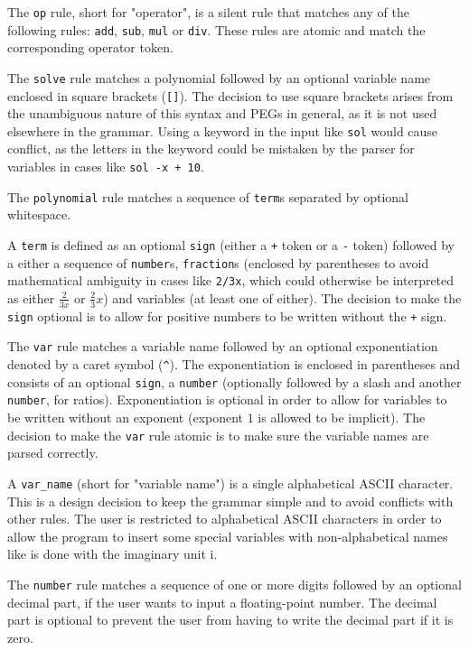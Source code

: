 The \verb|op| rule, short for "operator", is a silent rule that matches any of the following rules: \verb|add|, \verb|sub|, \verb|mul| or \verb|div|. These rules are atomic and match the corresponding operator token.

The \verb|solve| rule matches a polynomial followed by an optional variable name enclosed in square brackets (\verb|[]|). The decision to use square brackets arises from the unambiguous nature of this syntax and PEGs in general, as it is not used elsewhere in the grammar. Using a keyword in the input like \verb|sol| would cause conflict, as the letters in the keyword could be mistaken by the parser for variables in cases like \verb|sol -x + 10|.

The \verb|polynomial| rule matches a sequence of \verb|term|s separated by optional whitespace.

A \verb|term| is defined as an optional \verb|sign| (either a \verb|+| token or a \verb|-| token) followed by a either a sequence of \verb|number|s, \verb|fraction|s (enclosed by parentheses to avoid mathematical ambiguity in cases like \verb|2/3x|, which could otherwise be interpreted as either $\frac{2}{3x}$ or $\frac{2}{3}x$) and variables (at least one of either). The decision to make the \verb|sign| optional is to allow for positive numbers to be written without the \verb|+| sign.

The \verb|var| rule matches a variable name followed by an optional exponentiation denoted by a caret symbol (\verb|^|). The exponentiation is enclosed in parentheses and consists of an optional \verb|sign|, a \verb|number| (optionally followed by a slash and another \verb|number|, for ratios). Exponentiation is optional in order to allow for variables to be written without an exponent (exponent $1$ is allowed to be implicit). The decision to make the \verb|var| rule atomic is to make sure the variable names are parsed correctly.

A \verb|var_name| (short for "variable name") is a single alphabetical ASCII character. This is a design decision to keep the grammar simple and to avoid conflicts with other rules. The user is restricted to alphabetical ASCII characters in order to allow the program to insert some special variables with non-alphabetical names like is done with the imaginary unit $\mathrm{i}$.

The \verb|number| rule matches a sequence of one or more digits followed by an optional decimal part, if the user wants to input a floating-point number. The decimal part is optional to prevent the user from having to write the decimal part if it is zero.

